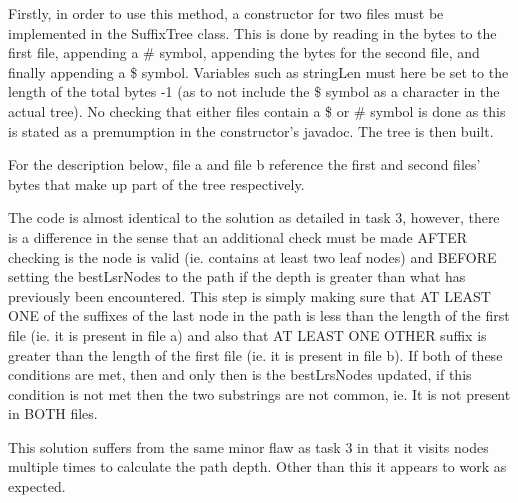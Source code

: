 \documentclass[12pt]{article} %
\begin{document}
Firstly, in order to use this method, a constructor for two files must be implemented in the
SuffixTree class. This is done by reading in the bytes to the first file, appending a \# symbol,
appending the bytes for the second file, and finally appending a \$ symbol. Variables such as
stringLen must here be set to the length of the total bytes -1 (as to not include the \$ symbol as a
character in the actual tree). No checking that either files contain a \$ or \# symbol is done as this is stated as a premumption in the constructor's javadoc. The tree is then built.

For the description below, file a and file b reference the first and second files' bytes that make
up part of the tree respectively.

The code is almost identical to the solution as detailed in task 3, however, there is a difference
in the sense that an additional check must be made AFTER checking is the node is valid (ie.
contains at least two leaf nodes) and BEFORE setting the bestLsrNodes to the path if the depth is
greater than what has previously been encountered. This step is simply making sure that AT LEAST
ONE of the suffixes of the last node in the path is less than the length of the first file (ie. it
is present in file a) and also that AT LEAST ONE OTHER suffix is greater than the length of the
first file (ie. it is present in file b). If both of these conditions are met, then and only
then is the bestLrsNodes updated, if this condition is not met then the two substrings are not
common, ie. It is not present in BOTH files. 

This solution suffers from the same minor flaw as task 3 in that it visits nodes multiple times to
calculate the path depth. Other than this it appears to work as expected.
\newpage



 

\end{document}
